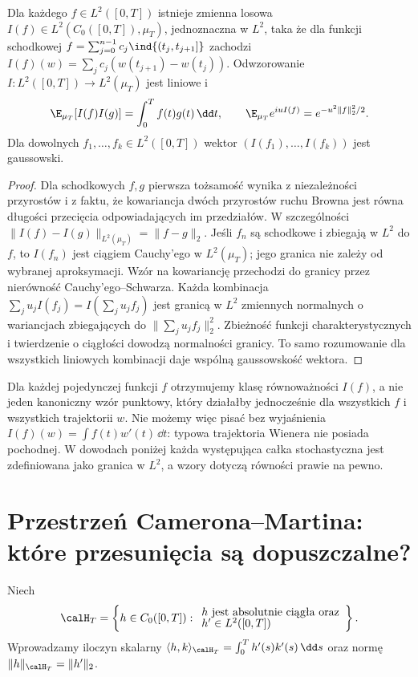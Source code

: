 \begin{twierdzenie}
\label{th:pw-map}
Dla każdego $f\in L^2([0,T])$ istnieje zmienna losowa
$I(f)\in L^2(C_0([0,T]),\mu_T)$, jednoznaczna w $L^2$,
taka że dla funkcji schodkowej
$f=\sum_{j=0}^{n-1}c_j\ind{(t_j,t_{j+1}]}$ zachodzi
$I(f)(w)=\sum_j c_j(w(t_{j+1})-w(t_j))$.
Odwzorowanie $I:L^2([0,T])\to L^2(\mu_T)$ jest liniowe i
\[
\E_{\mu_T}[I(f)I(g)]=\int_0^T f(t)g(t)\,\dd t,
\qquad
\E_{\mu_T}e^{iuI(f)}=e^{-u^2\|f\|_2^2/2}.
\]
Dla dowolnych $f_1,\ldots,f_k\in L^2([0,T])$ wektor
$(I(f_1),\ldots,I(f_k))$ jest gaussowski.
\end{twierdzenie}
\begin{proof}
Dla schodkowych $f,g$ pierwsza tożsamość wynika z niezależności
przyrostów i z faktu, że kowariancja dwóch przyrostów ruchu Browna
jest równa długości przecięcia odpowiadających im przedziałów.
W szczególności $\|I(f)-I(g)\|_{L^2(\mu_T)}=\|f-g\|_2$.
Jeśli $f_n$ są schodkowe i zbiegają w $L^2$ do $f$,
to $I(f_n)$ jest ciągiem Cauchy'ego w $L^2(\mu_T)$;
jego granica nie zależy od wybranej aproksymacji.
Wzór na kowariancję przechodzi do granicy przez nierówność
Cauchy'ego--Schwarza. Każda kombinacja
$\sum_j u_jI(f_j)=I(\sum_j u_jf_j)$ jest granicą w $L^2$
zmiennych normalnych o wariancjach zbiegających do
$\|\sum_j u_jf_j\|_2^2$. Zbieżność funkcji charakterystycznych
i twierdzenie o ciągłości dowodzą normalności granicy.
To samo rozumowanie dla wszystkich liniowych kombinacji
daje wspólną gaussowskość wektora.
\end{proof}

\begin{uwaga}
Dla każdej pojedynczej funkcji $f$ otrzymujemy klasę
równoważności $I(f)$, a nie jeden kanoniczny wzór punktowy,
który działałby jednocześnie dla wszystkich $f$ i wszystkich
trajektorii $w$. Nie możemy więc pisać bez wyjaśnienia
$I(f)(w)=\int f(t)w'(t)\,\dd t$: typowa trajektoria
Wienera nie posiada pochodnej. W dowodach poniżej każda
występująca całka stochastyczna jest zdefiniowana jako
granica w $L^2$, a wzory dotyczą równości prawie na pewno.
\end{uwaga}

\section{Przestrzeń Camerona--Martina: które przesunięcia są dopuszczalne?}

\begin{definicja}
\label{def:CMspace}
Niech
\[
\calH_T=\left\{h\in C_0([0,T]):
\begin{array}{l}
 h\text{ jest absolutnie ciągła oraz}\\[-2pt]
 h'\in L^2([0,T])
\end{array}\right\}.
\]
Wprowadzamy iloczyn skalarny
$\langle h,k\rangle_{\calH_T}=\int_0^T h'(s)k'(s)\,\dd s$
oraz normę $\|h\|_{\calH_T}=\|h'\|_2$.
\end{definicja}

